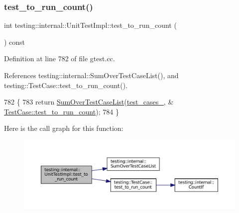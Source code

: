 \subsubsection{\texorpdfstring{test\+\_\+to\+\_\+run\+\_\+count()}{test\_to\_run\_count()}}
{\footnotesize\ttfamily int testing\+::internal\+::\+Unit\+Test\+Impl\+::test\+\_\+to\+\_\+run\+\_\+count (\begin{DoxyParamCaption}{ }\end{DoxyParamCaption}) const}



Definition at line 782 of file gtest.\+cc.



References testing\+::internal\+::\+Sum\+Over\+Test\+Case\+List(), and testing\+::\+Test\+Case\+::test\+\_\+to\+\_\+run\+\_\+count().


\begin{DoxyCode}
782                                           \{
783   \textcolor{keywordflow}{return} \hyperlink{namespacetesting_1_1internal_a564f9e608c608736ebe2199ab831745b}{SumOverTestCaseList}(\hyperlink{classtesting_1_1internal_1_1UnitTestImpl_a79ec0f733ada2898efd1a7fbd8587fb3}{test\_cases\_}, &
      \hyperlink{classtesting_1_1TestCase_a57f115315eb756e23be6651bb5e6c638}{TestCase::test\_to\_run\_count});
784 \}
\end{DoxyCode}
Here is the call graph for this function\+:
\nopagebreak
\begin{figure}[H]
\begin{center}
\leavevmode
\includegraphics[width=350pt]{classtesting_1_1internal_1_1UnitTestImpl_a0f15365d1d1ce00eaeb6f8a1370113ec_cgraph}
\end{center}
\end{figure}
\mbox{\label{classtesting_1_1internal_1_1UnitTestImpl_ac1d81d6b146b2dbce460f9a0a57d4f9e}} 
